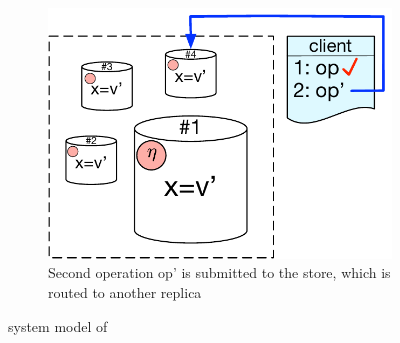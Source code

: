 \begin{figure}[t]
\begin{subfigure}[t]{0.31\textwidth}
	\includegraphics[scale=0.32]{Figures/system_model3.pdf}
        \caption{\scriptsize Second operation op' is submitted to the store, which
	is routed to another replica}
        \label{fig:sys_model3}
    \end{subfigure}
    \caption{system model of \tool}\label{fig:system_model}
\end{figure}
